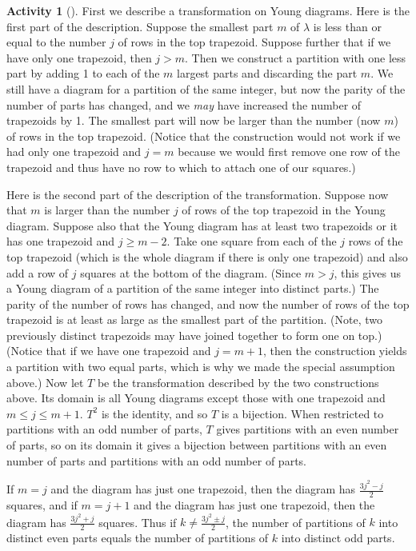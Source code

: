\documentclass[10pt,]{book}
\theoremstyle{plain}
\theoremstyle{definition}
\newtheorem{activity}[project]{Activity}
\numberwithin{equation}{chapter}
\begin{document}
\begin{activity}[]
\par
First we describe a transformation on Young diagrams. Here is the first part of the description. Suppose the smallest part \(m\) of \(\lambda\) is less than or equal to the number \(j\) of rows in the top trapezoid. Suppose further that if we have only one trapezoid, then \(j>m\). Then we construct a partition with one less part by adding 1 to each of the \(m\) largest parts and discarding the part \(m\). We still have a diagram for a partition of the same integer, but now the parity of the number of parts has changed, and we \emph{may} have increased the number of trapezoids by 1. The smallest part will now be larger than the number (now \(m\)) of rows in the top trapezoid. (Notice that the construction would not work if we had only one trapezoid and \(j=m\) because we would first remove one row of the trapezoid and thus have no row to which to attach one of our squares.)%
\par
Here is the second part of the description of the transformation. Suppose now that \(m\) is larger than the number \(j\) of rows of the top trapezoid in the Young diagram. Suppose also that the Young diagram has at least two trapezoids or it has one trapezoid and \(j\ge m-2\). Take one square from each of the \(j\) rows of the top trapezoid (which is the whole diagram if there is only one trapezoid) and also add a row of \(j\) squares at the bottom of the diagram. (Since \(m>j\), this gives us a Young diagram of a partition of the same integer into distinct parts.) The parity of the number of rows has changed, and now the number of rows of the top trapezoid is at least as large as the smallest part of the partition. (Note, two previously distinct trapezoids may have joined together to form one on top.)  (Notice that if we have one trapezoid and \(j= m+1\), then the construction yields a partition with two equal parts, which is why we made the special assumption above.) Now let \(T\) be the transformation described by the two constructions above. Its domain is all Young diagrams except those with one trapezoid and \(m\le j\le m+1\). \(T^2\) is the identity, and so \(T\) is a bijection.  When restricted to partitions with an odd number of parts, \(T\) gives partitions with an even number of parts, so on its domain it gives a bijection between partitions with an even number of parts and partitions with an odd number of parts.%
\par
If \(m=j\) and the diagram has just one trapezoid, then the diagram has \(\frac{3j^2-j}{2}\) squares, and if \(m=j+1\) and the diagram has just one trapezoid, then the diagram has \(\frac{3j^2+j}{2}\) squares. Thus if \(k\ne \frac{3j^2\pm j}{2}\), the number of partitions of \(k\) into distinct even parts equals the number of partitions of \(k\) into distinct odd parts.%

\end{activity}
\end{document}

